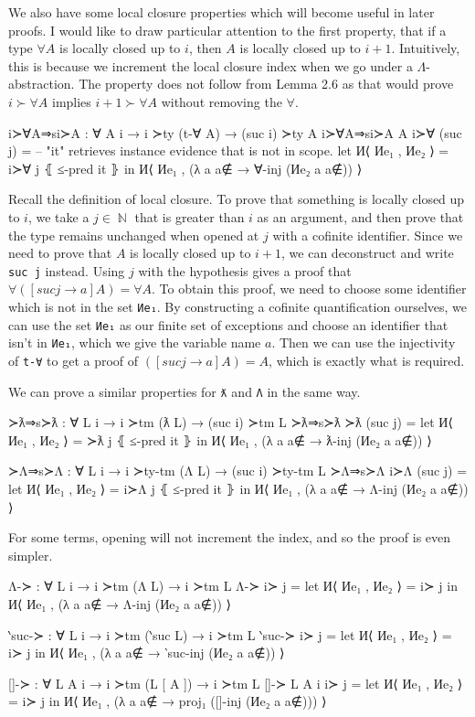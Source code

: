 \documentclass[logo,bsc,singlespacing,parskip,online]{infthesis}
\DeclareMathOperator{\nat}{\mathbb{N}}
\begin{document}
We also have some local closure properties which will become useful in later proofs. I would like to
draw particular attention to the first property, that if a type $\forall A$ is locally closed up to
$i$, then $A$ is locally closed up to $i + 1$. Intuitively, this is because we increment the local
closure index when we go under a $\Lambda$-abstraction. The property does not follow from Lemma 2.6
as that would prove $i \succ \forall A$ implies $i + 1 \succ \forall A$ without removing the
$\forall$.
\begin{code}
  i≻∀A⇒si≻A : ∀ {A i} → i ≻ty (t-∀ A) → (suc i) ≻ty A
  i≻∀A⇒si≻A {A} i≻∀ (suc j) =
    -- "it" retrieves instance evidence that is not in scope.
    let И⟨ Иe₁ , Иe₂ ⟩ = i≻∀ j ⦃ ≤-pred it ⦄
    in И⟨ Иe₁ , (λ a {a∉} → ∀-inj (Иe₂ a {a∉})) ⟩
\end{code}

Recall the definition of local closure. To prove that something is locally closed up to $i$, we take
a $j \in \nat$ that is greater than $i$ as an argument, and then prove that the type remains
unchanged when opened at $j$ with a cofinite identifier. Since we need to prove that $A$ is locally
closed up to $i + 1$, we can deconstruct and write \texttt{suc j} instead. Using $j$ with the
hypothesis gives a proof that $\forall ([suc j \to a] A) = \forall A$. To obtain this proof, we need
to choose some identifier which is not in the set \texttt{Иe₁}. By constructing a cofinite
quantification ourselves, we can use the set \texttt{Иe₁} as our finite set of exceptions and choose
an identifier that isn't in \texttt{Иe₁}, which we give the variable name $a$. Then we can use the
injectivity of \texttt{t-∀} to get a proof of $([suc j \to a] A) = A$, which is exactly what is
required.

We can prove a similar properties for \texttt{ƛ} and \texttt{Λ} in the same way.
\begin{code}
  ≻ƛ⇒s≻ƛ : ∀ {L i} → i ≻tm (ƛ L) → (suc i) ≻tm L
  ≻ƛ⇒s≻ƛ ≻ƛ (suc j) = let И⟨ Иe₁ , Иe₂ ⟩ = ≻ƛ j ⦃ ≤-pred it ⦄
    in И⟨ Иe₁ , (λ a {a∉} → ƛ-inj (Иe₂ a {a∉})) ⟩

  ≻Λ⇒s≻Λ : ∀ {L i} → i ≻ty-tm (Λ L) → (suc i) ≻ty-tm L
  ≻Λ⇒s≻Λ i≻Λ (suc j) = let И⟨ Иe₁ , Иe₂ ⟩ = i≻Λ j ⦃ ≤-pred it ⦄
    in И⟨ Иe₁ , (λ a {a∉} → Λ-inj (Иe₂ a {a∉})) ⟩
\end{code}

For some terms, opening will not increment the index, and so the proof is even simpler.
\begin{code}
  Λ-≻ : ∀ {L i} → i ≻tm (Λ L) → i ≻tm L
  Λ-≻ i≻ j = let И⟨ Иe₁ , Иe₂ ⟩ = i≻ j
    in И⟨ Иe₁ , (λ a {a∉} → Λ-inj (Иe₂ a {a∉})) ⟩

  ‵suc-≻ : ∀ {L i} → i ≻tm (‵suc L) → i ≻tm L
  ‵suc-≻ i≻ j = let И⟨ Иe₁ , Иe₂ ⟩ = i≻ j
    in И⟨ Иe₁ , (λ a {a∉} → ‵suc-inj (Иe₂ a {a∉})) ⟩

  []-≻ : ∀ {L A i} → i ≻tm (L [ A ]) → i ≻tm L
  []-≻ {L} {A} {i} i≻ j = let И⟨ Иe₁ , Иe₂ ⟩ = i≻ j
    in И⟨ Иe₁ , (λ a {a∉} → proj₁ ([]-inj (Иe₂ a {a∉}))) ⟩
\end{code}
\end{document}
